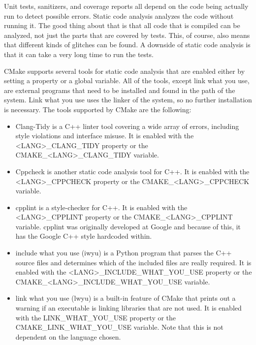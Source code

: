 Unit tests, sanitizers, and coverage reports all depend on the code being actually run to detect possible errors. Static code analysis analyzes the code without running it. The good thing about that is that all code that is compiled can be analyzed, not just the parts that are covered by tests. This, of course, also means that different kinds of glitches can be found. A downside of static code analysis is that it can take a very long time to run the tests.

CMake supports several tools for static code analysis that are enabled either by setting a property or a global variable. All of the tools, except link what you use, are external programs that need to be installed and found in the path of the system. Link what you use uses the linker of the system, so no further installation is necessary. The tools supported by CMake are the following:

\begin{itemize}
\item 
Clang-Tidy is a C++ linter tool covering a wide array of errors, including style violations and interface misuse. It is enabled with the <LANG>\_CLANG\_TIDY property or the CMAKE\_<LANG>\_CLANG\_TIDY variable.

\item 
Cppcheck is another static code analysis tool for C++. It is enabled with the <LANG>\_CPPCHECK property or the CMAKE\_<LANG>\_CPPCHECK variable.

\item 
cpplint is a style-checker for C++. It is enabled with the <LANG>\_CPPLINT property or the CMAKE\_<LANG>\_CPPLINT variable. cpplint was originally developed at Google and because of this, it has the Google C++ style hardcoded within.

\item 
include what you use (iwyu) is a Python program that parses the C++ source files and determines which of the included files are really required. It is enabled with the <LANG>\_INCLUDE\_WHAT\_YOU\_USE property or the CMAKE\_<LANG>\_INCLUDE\_WHAT\_YOU\_USE variable.

\item 
link what you use (lwyu) is a built-in feature of CMake that prints out a warning if an executable is linking libraries that are not used. It is enabled with the LINK\_WHAT\_YOU\_USE property or the CMAKE\_LINK\_WHAT\_YOU\_USE variable. Note that this is not dependent on the language chosen.
\end{itemize}

